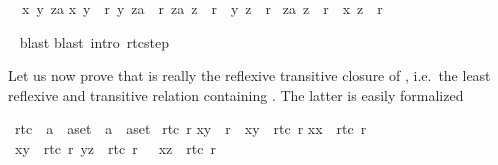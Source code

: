 \begin{isabellebody}
\begin{isamarkuptxt}
\begin{isabelle}
\ {}{\isachardot}\ {\isasymAnd}x\ y\ za{\isachardot}\isanewline
{}x{\isacharcomma}\ y{\isacharparenright}\ {\isasymin}\ r{\isacharsemicolon}\ {\isacharparenleft}y{\isacharcomma}\ za{\isacharparenright}\ {\isasymin}\ r{\isacharasterisk}{\isacharsemicolon}\ {\isacharparenleft}za{\isacharcomma}\ z{\isacharparenright}\ {\isasymin}\ r{\isacharasterisk}\ {\isasymlongrightarrow}\ {\isacharparenleft}y{\isacharcomma}\ z{\isacharparenright}\ {\isasymin}\ r{\isacharasterisk}{\isasymrbrakk}\isanewline
{}\ {\isacharparenleft}za{\isacharcomma}\ z{\isacharparenright}\ {\isasymin}\ r{\isacharasterisk}\ {\isasymlongrightarrow}\ {\isacharparenleft}x{\isacharcomma}\ z{\isacharparenright}\ {\isasymin}\ r{\isacharasterisk}%
\end{isabelle}%
\end{isamarkuptxt}%
\ \isamarkupfalse%
blast{\isacharparenright}\isanewline
\isamarkupfalse%
blast\ intro{\isacharcolon}\ rtc{\isacharunderscore}step{\isacharparenright}\isanewline
\isamarkupfalse%
%
\endisatagproof
{\isafoldproof}%
%
\isadelimproof
%
\endisadelimproof
\isamarkuptrue%
%
\begin{isamarkuptext}%
Let us now prove that  is really the reflexive transitive closure
of , i.e.\ the least reflexive and transitive
relation containing . The latter is easily formalized%
\end{isamarkuptext}%
\isamarkupfalse%
\ rtc{}\ {\isacharcolon}{\isacharcolon}\ {\isachardoublequote}{\isacharparenleft}{\isacharprime}a\ {\isasymtimes}\ {\isacharprime}a{\isacharparenright}set\ {\isasymRightarrow}\ {\isacharparenleft}{\isacharprime}a\ {\isasymtimes}\ {\isacharprime}a{\isacharparenright}set{\isachardoublequote}\isanewline
\isamarkupfalse%
\ {\isachardoublequote}rtc{}\ r{\isachardoublequote}\isanewline
{}\isanewline
{\isachardoublequote}{\isacharparenleft}x{\isacharcomma}y{\isacharparenright}\ {\isasymin}\ r\ {\isasymLongrightarrow}\ {\isacharparenleft}x{\isacharcomma}y{\isacharparenright}\ {\isasymin}\ rtc{}\ r{\isachardoublequote}\isanewline
{\isachardoublequote}{\isacharparenleft}x{\isacharcomma}x{\isacharparenright}\ {\isasymin}\ rtc{}\ r{\isachardoublequote}\isanewline
{\isachardoublequote}{\isasymlbrakk}\ {\isacharparenleft}x{\isacharcomma}y{\isacharparenright}\ {\isasymin}\ rtc{}\ r{\isacharsemicolon}\ {\isacharparenleft}y{\isacharcomma}z{\isacharparenright}\ {\isasymin}\ rtc{}\ r\ {\isasymrbrakk}\ {\isasymLongrightarrow}\ {\isacharparenleft}x{\isacharcomma}z{\isacharparenright}\ {\isasymin}\ rtc{}\ r{\isachardoublequote}\isamarkuptrue%

\end{isabellebody}
